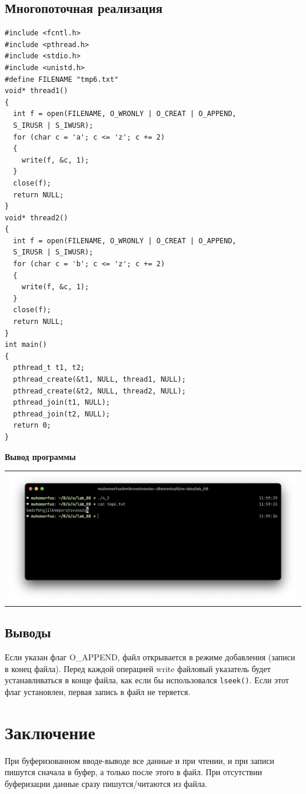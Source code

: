 \section{Многопоточная реализация}

\begin{lstlisting}
#include <fcntl.h>
#include <pthread.h>
#include <stdio.h>
#include <unistd.h>
#define FILENAME "tmp6.txt"
void* thread1()
{
  int f = open(FILENAME, O_WRONLY | O_CREAT | O_APPEND,
  S_IRUSR | S_IWUSR);
  for (char c = 'a'; c <= 'z'; c += 2)
  {
    write(f, &c, 1);
  }
  close(f);
  return NULL;
}
void* thread2() 
{
  int f = open(FILENAME, O_WRONLY | O_CREAT | O_APPEND,
  S_IRUSR | S_IWUSR);
  for (char c = 'b'; c <= 'z'; c += 2)
  { 
    write(f, &c, 1);
  }
  close(f);
  return NULL;
}
int main()
{
  pthread_t t1, t2;
  pthread_create(&t1, NULL, thread1, NULL);
  pthread_create(&t2, NULL, thread2, NULL);
  pthread_join(t1, NULL);
  pthread_join(t2, NULL);
  return 0;
}
\end{lstlisting}

\textbf{Вывод программы}

 \begin{table}[H]
	\centering
	\begin{tabular}{p{1\linewidth}}
		\centering
		\includegraphics[width=0.9\linewidth]{./images/10.png}
	\end{tabular}
\end{table}

\section{Выводы}
Если указан флаг O\_APPEND, файл открывается в режиме добавления (записи в конец файла). Перед каждой операцией write файловый указатель будет устанавливаться в конце файла, как если бы использовался \texttt{lseek()}. Если этот флаг установлен, первая запись в файл не теряется.

\chapter{Заключение}
При буферизованном вводе-выводе все данные и при чтении, и при записи пишутся сначала в буфер, а только после этого в файл. При отсутствии буферизации данные сразу пишутся/читаются из файла. 

